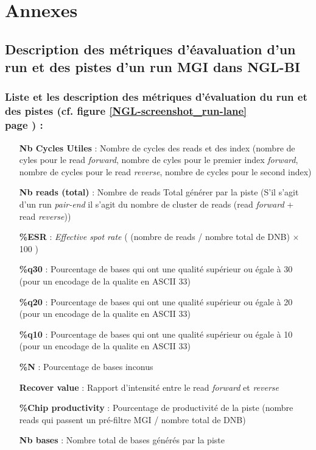 \section{Annexes}
\subsection*{Description des métriques d'éavaluation d'un run et des pistes d'un run MGI dans NGL-BI}
\label{anexes1}
\subsubsection*{Liste et les description des métriques d'évaluation du run et des pistes (cf. figure \ref{NGL-screenshot_run-lane} \\page \pageref{NGL-screenshot_run-lane}) :}
\begin{itemize}
    \item[\textbf{Nb Cycles Utiles} :] Nombre de cycles des reads et des index (nombre de cyles pour le read \emph{forward}, nombre de cyles pour le premier index  \emph{forward}, nombre de cycles pour le read \emph{reverse}, nombre de cycles pour le second index)
    \item[\textbf{Nb reads (total)} :] Nombre de reads Total générer par la piste (S'il s'agit d'un run \emph{pair-end} il s'agit du nombre de cluster de reads (read \emph{forward} + read \emph{reverse}))
    \item[\textbf{\%ESR} :] \emph{Effective spot rate} ( (nombre de reads / nombre total de DNB) $\times$ 100 )
    \item[\textbf{\%q30} :] Pourcentage de bases qui ont une qualité supérieur ou égale à 30 (pour un encodage de la qualite en ASCII 33)
    \item[\textbf{\%q20} :] Pourcentage de bases qui ont une qualité supérieur ou égale à 20 (pour un encodage de la qualite en ASCII 33)
    \item[\textbf{\%q10} :] Pourcentage de bases qui ont une qualité supérieur ou égale à 10 (pour un encodage de la qualite en ASCII 33)
    \item[\textbf{\%N} :] Pourcentage de bases inconus
    \item[\textbf{Recover value} :] Rapport d'intensité entre le read \emph{forward} et \emph{reverse}
    \item[\textbf{\%Chip productivity} :] Pourcentage de productivité de la piste (nombre reads qui passent un pré-filtre MGI / nombre total de DNB)
    \item[\textbf{Nb bases} :] Nombre total de bases générés par la piste

\end{itemize}
